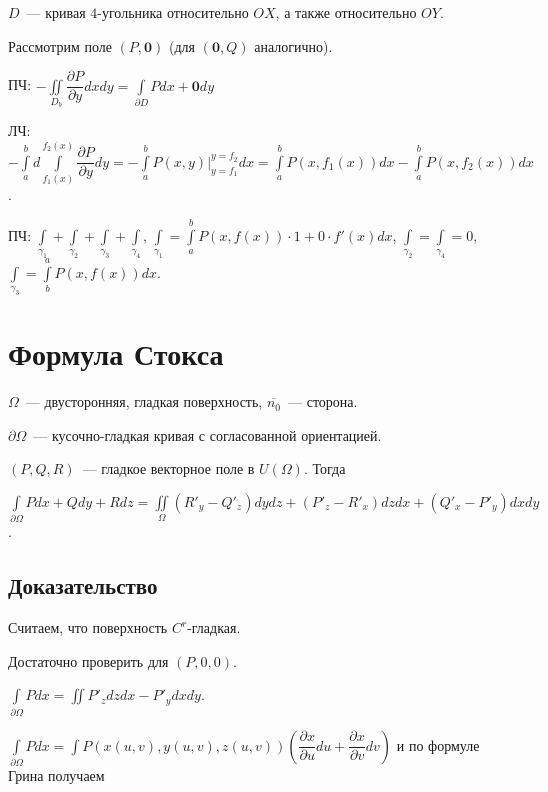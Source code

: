 \documentclass{article}
\begin{document}
            $D$~--- кривая $4$-угольника относительно $OX$, а также относительно $OY$.
            
            Рассмотрим поле $(P, \mathbf{0})$ (для $(\mathbf{0}, Q)$ аналогично).
            
            ПЧ: $-\iint\limits_{D_b} \dfrac{\partial P}{\partial y} dx dy = \int\limits_{\partial D} Pdx + \mathbf{0} dy$
            
            ЛЧ: $-\int\limits^b_a d \int\limits^{f_2(x)}_{f_1(x)} \dfrac{\partial P}{\partial y} dy = - \int\limits^b_a P(x, y) \bigg|^{y = f_2}_{y = f_1} dx = \int\limits^b_a P(x, f_1(x))dx - \int\limits^b_a P(x, f_2(x)) dx$.
            
            ПЧ: $\int\limits_{\gamma_1} + \int\limits_{\gamma_2} + \int\limits_{\gamma_3} + \int\limits_{\gamma_4}$, $\int\limits_{\gamma_1} = \int\limits^b_a P(x, f(x)) \cdot 1 + 0 \cdot f'(x) dx$, $\int\limits_{\gamma_2} = \int\limits_{\gamma_4} = 0$, $\int\limits_{\gamma_3} = \int\limits^a_b P(x, f(x)) dx$.
            
    \newpage
    
    \section{Формула Стокса}
    
        $\Omega$~--- двусторонняя, гладкая поверхность, $\overline{n_0}$~--- сторона.
        
        $\partial \Omega$~--- кусочно-гладкая кривая с согласованной ориентацией.
        
        $(P, Q, R)$~--- гладкое векторное поле в $U(\Omega)$. Тогда 
        
        $\int\limits_{\partial \Omega} P dx + Q dy + R dz = \iint\limits_{\Omega} (R'_y - Q'_z) dy dz + (P'_z - R'_x) dzdx + (Q'_x - P'_y) dxdy$.
        
        \subsection{Доказательство}
        
            Считаем, что поверхность $C^r$-гладкая.
            
            Достаточно проверить для $(P, 0, 0)$.
            
            $\int\limits_{\partial \Omega} P dx = \iint P'_z dzdx - P'_y dxdy$.
            
            $\int\limits_{\partial \Omega} P dx = \int P(x(u, v), y(u, v), z(u, v)) \left( \dfrac{\partial x}{\partial u} du + \dfrac{\partial x}{\partial v} dv \right)$ и по формуле Грина получаем
            
\end{document}
